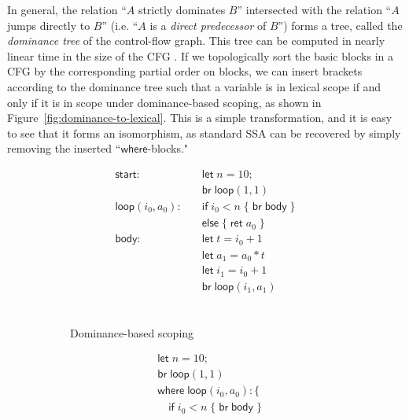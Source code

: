 \documentclass[acmsmall,screen,review]{acmart}
\newcommand{\ms}[1]{\ensuremath{\mathsf{#1}}}
\begin{document}
In general, the relation ``$A$ strictly dominates $B$'' intersected with the relation ``$A$ jumps
directly to $B$'' (i.e. ``$A$ is a \textit{direct predecessor} of $B$'') forms a tree, called the
\textit{dominance tree} of the control-flow graph. This tree can be computed in nearly linear time
in the size of the CFG \cite{cytron-ssa-intro-91}. If we topologically sort the basic blocks in a CFG by the
corresponding partial order on blocks, we can insert brackets according to the dominance tree such
that a variable is in lexical scope if and only if it is in scope under dominance-based scoping, as
shown in Figure~\ref{fig:dominance-to-lexical}. This is a simple transformation, and it is easy to
see that it forms an isomorphism, as standard SSA can be recovered by simply removing the inserted
``\ms{where}-blocks."

\begin{figure}
  \centering
  \begin{subfigure}[t]{.5\textwidth}
    \begin{align*}
      \ms{start}:\quad            & \ms{let}\;n = 10; \\
                                  & \ms{br}\;\ms{loop}(1, 1) \\
      \ms{loop}(i_0, a_0): \quad  & \ms{if}\;i_0 < n\; \{\;\ms{br}\;\ms{body}\;\} \\
                                  & \ms{else}\;\{\;\ms{ret}\;a_0\;\} \\
      \ms{body}: \quad            & \ms{let}\;t = i_0 + 1 \\
                                  & \ms{let}\;a_1 = a_0 * t \\
                                  & \ms{let}\;i_1 = i_0 + 1 \\
                                  & \ms{br}\;\ms{loop}(i_1, a_1) \\ \\ \\ \\ 
    \end{align*}
    \caption{Dominance-based scoping}
  \end{subfigure}%
  \begin{subfigure}[t]{.5\textwidth}
    \begin{align*}
      & \ms{let}\;n = 10; \\
      & \ms{br}\;\ms{loop}(1, 1) \\
      & \ms{where}\;\ms{loop}(i_0, a_0): \{ \\
      & \quad \ms{if}\;i_0 < n\;\{\;\ms{br}\;\ms{body}\;\} \\

\end{align*}
\end{subfigure}
\end{figure}
\end{document}
